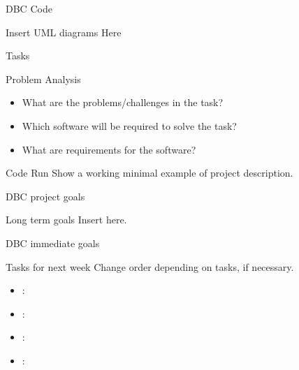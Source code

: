 \documentclass[9pt,usenames,dvipsnames]{beamer}
\title{\topicClass}
\subtitle{\topicTitle}
\date{Presentation date: \topicDueDate}
\author[\authorLastName]{\authorFullName}
\begin{document}
\maketitle

\begin{frame}{DBC Code}
	\begin{alertblock}{Insert UML diagrams}
    	Here
    \end{alertblock}
\end{frame}

\begin{frame}{Tasks}
	\begin{alertblock}{Problem Analysis}
	\begin{itemize}
	\item What are the problems/challenges in the task?\\
    \item Which software will be required to solve the task?\\
    \item What are requirements for the software?
	\end{itemize}
    \end{alertblock}
    
    \begin{alertblock}{Code Run}
    Show a working minimal example of project description.
    \end{alertblock}
\end{frame}

\begin{frame}{DBC project goals}
	\begin{alertblock}{Long term goals}
    	Insert here.
    \end{alertblock}
\end{frame}

\begin{frame}{DBC immediate goals}
	\begin{alertblock}{Tasks for next week}
	Change order depending on tasks, if necessary.
    	\begin{itemize}
    	\item {\color{OliveGreen}{Aaquib}}:
    	\item {\color{OliveGreen}{Pranjal}}:
    	\item {\color{OliveGreen}{Ramit}}:
    	\item {\color{OliveGreen}{Zahid}}:
    	\end{itemize}
    \end{alertblock}
\end{frame}

\end{document}
